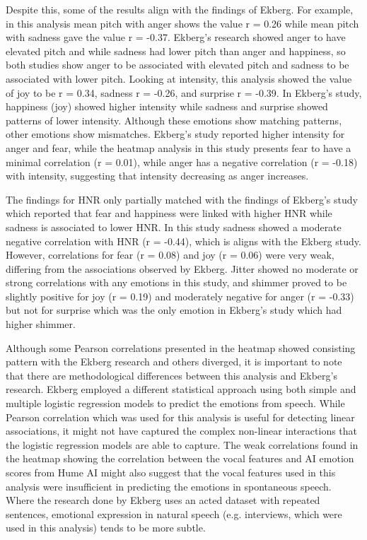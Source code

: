 Despite this, some of the results align with the findings of Ekberg. 
For example, in this analysis mean pitch with anger shows the value r = 0.26 while mean pitch with sadness gave the value r = -0.37. Ekberg’s research showed anger to have elevated pitch and while sadness had lower pitch than anger and happiness, so both studies show anger to be associated with elevated pitch and sadness to be associated with lower pitch.
Looking at intensity, this analysis showed the value of joy to be r = 0.34, sadness r = -0.26, and surprise r = -0.39. In Ekberg’s study, happiness (joy) showed higher intensity while sadness and surprise showed patterns of lower intensity. Although these emotions show matching patterns, other emotions show mismatches. Ekberg’s study reported higher intensity for anger and fear, while the heatmap analysis in this study presents fear to have a minimal correlation (r = 0.01), while anger has a negative correlation (r = -0.18) with intensity, suggesting that intensity decreasing as anger increases.

The findings for HNR only partially matched with the findings of Ekberg’s study which reported that fear and happiness were linked with higher HNR while sadness is associated to lower HNR. 
In this study sadness showed a moderate negative correlation with HNR (r = -0.44), which is aligns with the Ekberg study. However, correlations for fear (r = 0.08) and joy (r = 0.06) were very weak, differing from the associations observed by Ekberg.
Jitter showed no moderate or strong correlations with any emotions in this study, and shimmer proved to be slightly positive for joy (r = 0.19) and moderately negative for anger (r = -0.33) but not for surprise which was the only emotion in Ekberg’s study which had higher shimmer.

Although some Pearson correlations presented in the heatmap showed consisting pattern with the Ekberg research and others diverged, it is important to note that there are methodological differences between this analysis and Ekberg’s research. Ekberg employed a different statistical approach using both simple and multiple logistic regression models to predict the emotions from speech. While Pearson correlation which was used for this analysis is useful for detecting linear associations, it might not have captured the complex non-linear interactions that the logistic regression models are able to capture.
The weak correlations found in the heatmap showing the correlation between the vocal features and AI emotion scores from Hume AI might also suggest that the vocal features used in this analysis were insufficient in predicting the emotions in spontaneous speech. Where the research done by Ekberg uses an acted dataset with repeated sentences, emotional expression in natural speech (e.g. interviews, which were used in this analysis) tends to be more subtle.

